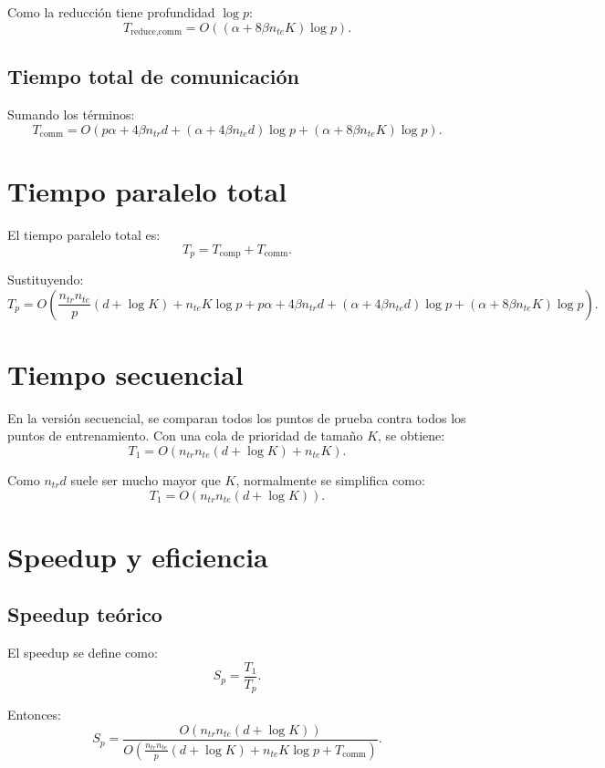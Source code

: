 \documentclass[11pt,a4paper]{article}
\begin{document}
Como la reducción tiene profundidad $\log p$:
\[
T_{\text{reduce,comm}}
=
O\left(
(\alpha + 8\beta n_{te}K)\log p
\right).
\]

\subsection{Tiempo total de comunicación}

Sumando los términos:
\[
\boxed{
T_{\text{comm}}
=
O\left(
p\alpha
+
4\beta n_{tr}d
+
(\alpha + 4\beta n_{te}d)\log p
+
(\alpha + 8\beta n_{te}K)\log p
\right)
}.
\]

\section{Tiempo paralelo total}

El tiempo paralelo total es:
\[
T_p = T_{\text{comp}} + T_{\text{comm}}.
\]

Sustituyendo:
\[
\boxed{
T_p
=
O\left(
\frac{n_{tr}n_{te}}{p}(d+\log K)
+
n_{te}K\log p
+
p\alpha
+
4\beta n_{tr}d
+
(\alpha + 4\beta n_{te}d)\log p
+
(\alpha + 8\beta n_{te}K)\log p
\right)
}.
\]

\section{Tiempo secuencial}

En la versión secuencial, se comparan todos los puntos de prueba contra todos los puntos de
entrenamiento. Con una cola de prioridad de tamaño $K$, se obtiene:
\[
\boxed{
T_1
=
O\left(
n_{tr}n_{te}(d+\log K)
+
n_{te}K
\right)
}.
\]

Como $n_{tr}d$ suele ser mucho mayor que $K$, normalmente se simplifica como:
\[
T_1
=
O(n_{tr}n_{te}(d+\log K)).
\]

\section{Speedup y eficiencia}

\subsection{Speedup teórico}

El speedup se define como:
\[
S_p = \frac{T_1}{T_p}.
\]

Entonces:
\[
\boxed{
S_p
=
\frac{
O(n_{tr}n_{te}(d+\log K))
}{
O\left(
\frac{n_{tr}n_{te}}{p}(d+\log K)
+
n_{te}K\log p
+
T_{\text{comm}}
\right)
}
}.
\]
\end{document}
